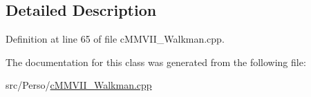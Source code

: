 \subsection{Detailed Description}


Definition at line 65 of file c\+M\+M\+V\+I\+I\+\_\+\+Walkman.\+cpp.



The documentation for this class was generated from the following file\+:\begin{DoxyCompactItemize}
\item 
src/\+Perso/\hyperlink{cMMVII__Walkman_8cpp}{c\+M\+M\+V\+I\+I\+\_\+\+Walkman.\+cpp}\end{DoxyCompactItemize}
